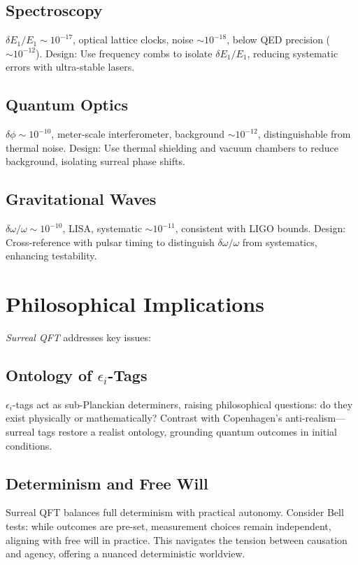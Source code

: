 \documentclass{article}
\begin{document}
\subsection{Spectroscopy}
\(\delta E_1 / E_1 \sim 10^{-17}\), optical lattice clocks, noise \(\sim 10^{-18}\), below QED precision (\(\sim 10^{-12}\)). Design: Use frequency combs to isolate \(\delta E_1 / E_1\), reducing systematic errors with ultra-stable lasers.

\subsection{Quantum Optics}
\(\delta \phi \sim 10^{-10}\), meter-scale interferometer, background \(\sim 10^{-12}\), distinguishable from thermal noise. Design: Use thermal shielding and vacuum chambers to reduce background, isolating surreal phase shifts.

\subsection{Gravitational Waves}
\(\delta \omega / \omega \sim 10^{-10}\), LISA, systematic \(\sim 10^{-11}\), consistent with LIGO bounds. Design: Cross-reference with pulsar timing to distinguish \(\delta \omega / \omega\) from systematics, enhancing testability.

\section{Philosophical Implications}
\textit{Surreal QFT} addresses key issues:
\subsection{Ontology of \(\epsilon_i\)-Tags}
\(\epsilon_i\)-tags act as sub-Planckian determiners, raising philosophical questions: do they exist physically or mathematically? Contrast with Copenhagen's anti-realism—surreal tags restore a realist ontology, grounding quantum outcomes in initial conditions.

\subsection{Determinism and Free Will}
Surreal QFT balances full determinism with practical autonomy. Consider Bell tests: while outcomes are pre-set, measurement choices remain independent, aligning with free will in practice. This navigates the tension between causation and agency, offering a nuanced deterministic worldview.
\end{document}
